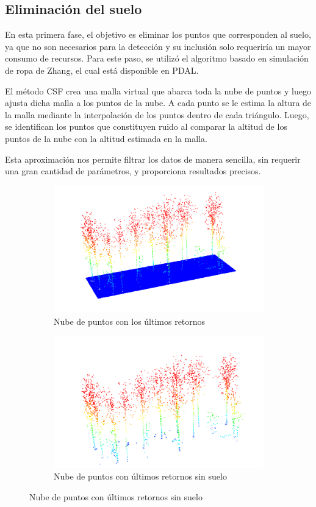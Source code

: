 \subsection{Eliminación del suelo}
\label{chap:groundAlgo}
En esta primera fase, el objetivo es eliminar los puntos que corresponden al suelo, ya que no son necesarios para la detección y su inclusión solo requeriría un mayor consumo de recursos. Para este paso, se utilizó el algoritmo basado en simulación de ropa de Zhang, el cual está disponible en PDAL.

El método CSF crea una malla virtual que abarca toda la nube de puntos y luego ajusta dicha malla a los puntos de la nube. A cada punto se le estima la altura de la malla mediante la interpolación de los puntos dentro de cada triángulo. Luego, se identifican los puntos que constituyen ruido al comparar la altitud de los puntos de la nube con la altitud estimada en la malla.

Esta aproximación nos permite filtrar los datos de manera sencilla, sin requerir una gran cantidad de parámetros, y proporciona resultados precisos.

\begin{figure}
  \begin{subfigure}{0.5\textwidth}
    \centering
    \includegraphics[width=0.8\linewidth]{imaxes/last.png}
    \caption{Nube de puntos con los últimos retornos}
    \label{fig:last1}
  \end{subfigure}%
  \begin{subfigure}{0.5\textwidth}
    \centering
    \includegraphics[width=0.8\linewidth]{imaxes/lastnog.png}
    \caption{Nube de puntos con últimos retornos sin suelo}
    \label{fig:last}
  \end{subfigure}
  \label{fig:algo2}
\end{figure}



